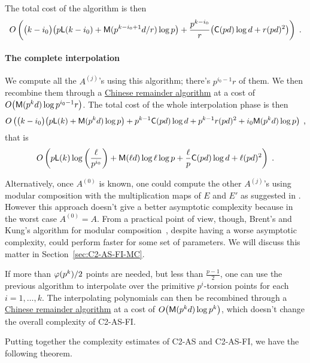 The total cost of the algorithm is then
\begin{equation*}
  \label{eq:T:complexity}
  O\left(\bigl(k-i_0\bigr)\bigl(p{\sf L}(k-i_0) + \mathsf{M}(p^{k-i_0+1}d/r)\log p\bigr) +
    \frac{p^{k-i_0}}{r}\bigl(\mathsf{C}(pd)\log d + r(pd)^2\bigr) \right)
  \;\text{.}
\end{equation*}


\paragraph{The complete interpolation}
We compute all the $A^{(j)}$'s using this algorithm; there's
$p^{i_0-1}r$ of them. We then recombine them through a
\hyperref[todo]{Chinese remainder algorithm} at a cost of
$O\bigl(\mathsf{M}(p^kd)\log p^{i_0-1}r\bigr)$. The total cost of the whole
interpolation phase is then
\begin{equation*}
  O\left(\bigl(k-i_0\bigr) \bigl(p{\sf L}(k) + \mathsf{M}(p^kd)\log p\bigr) +
    p^{k-1}\mathsf{C}(pd)\log d + p^{k-1}r(pd)^2 + i_0\mathsf{M}(p^kd)\log p
  \right)
  \;\text{,}
\end{equation*}
that is
\begin{equation}
  \label{eq:interp}
  O\left(p{\sf L}(k)\log\left(\frac{\ell}{p^{i_0}}\right) + 
    \mathsf{M}(\ell d)\log\ell\log p +
    \frac{\ell}{p}\mathsf{C}(pd)\log d +
    \ell (pd)^2
  \right)
  \;\text{.}
\end{equation}

Alternatively, once $A^{(0)}$ is known, one could compute the other
$A^{(j)}$'s using modular composition with the multiplication maps of
$E$ and $E'$ as suggested in \cite{couveignes96}. However this
approach doesn't give a better asymptotic complexity because in the
worst case $A^{(0)}=A$. From a practical point of view, though,
Brent's and Kung's algorithm for modular
composition~\cite{brent+kung}, despite having a worse asymptotic
complexity, could perform faster for some set of parameters. We will
discuss this matter in Section~\ref{sec:C2-AS-FI-MC}.

If more than $\varphi(p^k)/2$ points are needed, but less than
$\frac{p-1}{2}$, one can use the previous algorithm to interpolate
over the primitive $p^i$-torsion points for each $i=1,\ldots,k$. The
interpolating polynomials can then be recombined through a
\hyperref[todo]{Chinese remainder algorithm} at a cost of
$O\bigl(\mathsf{M}(p^kd)\log p^k\bigr)$, which doesn't change the overall
complexity of C2-AS-FI.


Putting together the complexity estimates of C2-AS and C2-AS-FI, we
have the following theorem.

